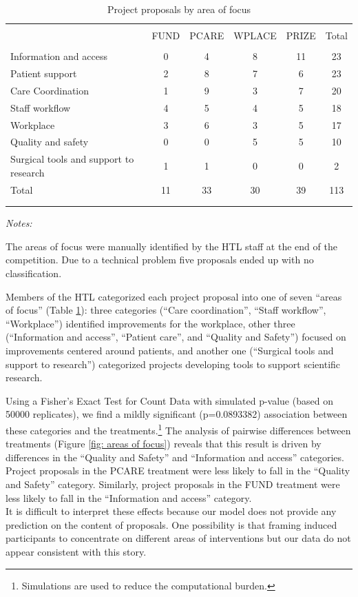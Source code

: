 \documentclass[11pt, titlepage]{article}
\newenvironment{tablenotes}[1][]{
  \begin{minipage}{\textwidth}\emph{Notes:}{\footnotesize #1}
}{\end{minipage}}
\begin{document}
\begin{table}
\centering
\caption{Project proposals by area of focus}
\label{tab: area-of-focus}
\begin{tabular}{@{}lccccc}
  \\[-1.8ex]\hline \hline \\[-1.8ex]
 & FUND & PCARE & WPLACE & PRIZE & Total \\ 
  \hline \\[-1.86ex]
Information and access & 0 & 4 & 8 & 11 & 23 \\ 
  Patient support & 2 & 8 & 7 & 6 & 23 \\ 
  Care Coordination & 1 & 9 & 3 & 7 & 20 \\ 
  Staff workflow & 4 & 5 & 4 & 5 & 18 \\ 
  Workplace & 3 & 6 & 3 & 5 & 17 \\ 
  Quality and safety  & 0 & 0 & 5 & 5 & 10 \\ 
  Surgical tools and support to research & 1 & 1 & 0 & 0 & 2 \\ 
  [1.8ex] Total & 11 & 33 & 30 & 39 & 113 \\ 
   \\[-1.8ex]\hline \hline \\[-1.8ex]
\end{tabular}
\begin{tablenotes}
The areas of focus were manually identified by the HTL staff at the end of the competition. Due to a technical problem five proposals ended up with no classification.
\end{tablenotes}
\end{table}

Members of the HTL categorized each project proposal into one of seven
``areas of focus'' (Table \ref{tab: area-of-focus}): three categories
(``Care coordination'', ``Staff workflow'', ``Workplace'') identified
improvements for the workplace, other three (``Information and access'',
``Patient care'', and ``Quality and Safety'') focused on improvements
centered around patients, and another one (``Surgical tools and support
to research'') categorized projects developing tools to support
scientific research.

Using a Fisher's Exact Test for Count Data with simulated p-value (based
on 50000 replicates), we find a mildly significant (p=0.0893382)
association between these categories and the treatments.\footnote{Simulations
  are used to reduce the computational burden.} The analysis of pairwise
differences between treatments (Figure \ref{fig: areas of focus})
reveals that this result is driven by differences in the ``Quality and
Safety'' and ``Information and access'' categories. Project proposals in
the PCARE treatment were less likely to fall in the ``Quality and
Safety'' category. Similarly, project proposals in the FUND treatment
were less likely to fall in the ``Information and access'' category.\\
It is difficult to interpret these effects because our model does not
provide any prediction on the content of proposals. One possibility is
that framing induced participants to concentrate on different areas of
interventions but our data do not appear consistent with this story.
\end{document}
